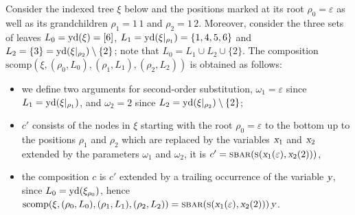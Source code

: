 \documentclass[../../document.tex]{subfiles}
\begin{document}
    \begin{example}\NoEndMark
        Consider the indexed tree \(\xi\) below and the positions marked at its root \(\rho_0 = \varepsilon\) as well as its grandchildren \(\rho_1 = 1\,1\) and \(\rho_2=1\,2\).
        Moreover, consider the three sets of leaves \(L_0 = \operatorname{yd}(\xi) = [6]\), \(L_1 = \operatorname{yd}(\xi|_{\rho_1}) = \{1,4,5,6\}\) and \(L_2 = \{3\} = \operatorname{yd}(\xi|_{\rho_2}) \setminus \{2\}\); note that \(L_0 = L_1 \cup L_2 \cup \{2\}\).
        The composition \(\mathrm{scomp}(\xi, (\rho_0, L_0), (\rho_1, L_1), (\rho_2, L_2))\) is obtained as follows:
        \begin{itemize}
            \item  we define two arguments for second-order substitution, \(\omega_1 = \varepsilon\) since \(L_1 = \operatorname{yd}(\xi|_{\rho_1})\), and \(\omega_2 = 2\) since \(L_2 = \operatorname{yd}(\xi|_{\rho_2}) \setminus \{2\}\);
            \item \(c'\) consists of the nodes in \(\xi\) starting with the root \(\rho_0 = \varepsilon\) to the bottom up to the positions \(\rho_1\) and \(\rho_2\) which are replaced by the variables \(\textsl{x}_1\) and \(\textsl{x}_2\) extended by the parameters \(\omega_1\) and \(\omega_2\), it is \(c' = \textsc{sbar}(\textsc{s} (\textsl{x}_1(\varepsilon), \textsl{x}_2(2)))\),
            \item the composition \(c\) is \(c'\) extended by a trailing occurrence of the variable \(\textsl{y}\), since \(L_0 = \operatorname{yd}(\xi_{\rho_0})\), hence \(\mathrm{scomp}(\xi, (\rho_0, L_0), (\rho_1, L_1), (\rho_2, L_2)) = \textsc{sbar}(\textsc{s} (\textsl{x}_1(\varepsilon), \textsl{x}_2(2))) \, \textsl{y}\).
        \end{itemize}
 

\end{example}
\end{document}
